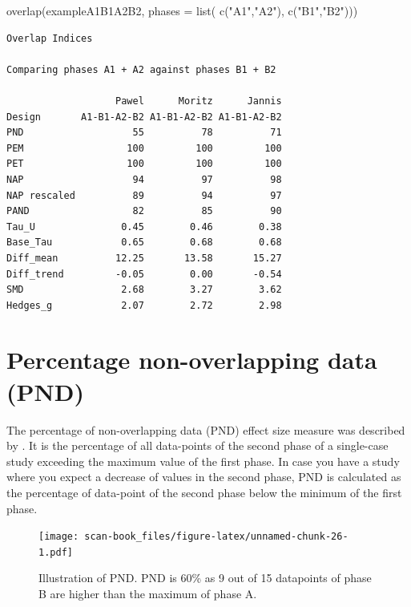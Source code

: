 \documentclass[
]{book}
\newenvironment{Shaded}{\begin{snugshade}}{\end{snugshade}}
\newcommand{\AttributeTok}[1]{\textcolor[rgb]{0.77,0.63,0.00}{#1}}
\newcommand{\FunctionTok}[1]{\textcolor[rgb]{0.00,0.00,0.00}{#1}}
\newcommand{\NormalTok}[1]{#1}
\newcommand{\StringTok}[1]{\textcolor[rgb]{0.31,0.60,0.02}{#1}}
\begin{document}
\begin{Shaded}
\begin{Highlighting}[]
\FunctionTok{overlap}\NormalTok{(exampleA1B1A2B2, }\AttributeTok{phases =} \FunctionTok{list}\NormalTok{( }\FunctionTok{c}\NormalTok{(}\StringTok{"A1"}\NormalTok{,}\StringTok{"A2"}\NormalTok{), }\FunctionTok{c}\NormalTok{(}\StringTok{"B1"}\NormalTok{,}\StringTok{"B2"}\NormalTok{)))}
\end{Highlighting}
\end{Shaded}

\begin{verbatim}
Overlap Indices

Comparing phases A1 + A2 against phases B1 + B2 

                   Pawel      Moritz      Jannis
Design       A1-B1-A2-B2 A1-B1-A2-B2 A1-B1-A2-B2
PND                   55          78          71
PEM                  100         100         100
PET                  100         100         100
NAP                   94          97          98
NAP rescaled          89          94          97
PAND                  82          85          90
Tau_U               0.45        0.46        0.38
Base_Tau            0.65        0.68        0.68
Diff_mean          12.25       13.58       15.27
Diff_trend         -0.05        0.00       -0.54
SMD                 2.68        3.27        3.62
Hedges_g            2.07        2.72        2.98
\end{verbatim}

\hypertarget{percentage-non-overlapping-data-pnd}{%
\section{Percentage non-overlapping data (PND)}\label{percentage-non-overlapping-data-pnd}}

The percentage of non-overlapping data (PND) effect size measure was described by \citet{scruggs_quantitative_1987} . It is the percentage of all data-points of the second phase of a single-case study exceeding the maximum value of the first phase. In case you have a study where you expect a decrease of values in the second phase, PND is calculated as the percentage of data-point of the second phase below the minimum of the first phase.

\begin{figure}
\centering
\texttt{[image: scan-book\_files/figure-latex/unnamed-chunk-26-1.pdf]}
\caption{\label{fig:unnamed-chunk-26}Illustration of PND. PND is 60\% as 9 out of 15 datapoints of phase B are higher than the maximum of phase A.}
\end{figure}
\end{document}
